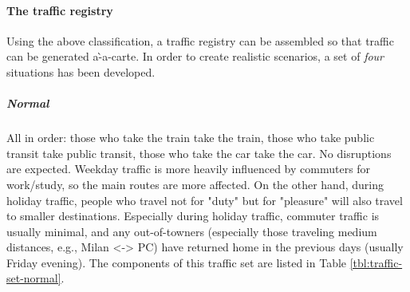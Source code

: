 \begin{table}[H]
  \label{tbl:traffic-types}
\end{table}

\paragraph{The traffic registry}

Using the above classification, a traffic registry can be assembled so that traffic can be generated a\`-a-carte.
In order to create realistic scenarios, a set of \textit{four} situations has been developed.

\subparagraph{Normal}

All in order: those who take the train take the train, those who take public transit take public transit, those who take the car take the car.
No disruptions are expected.
Weekday traffic is more heavily influenced by commuters for work/study, so the main routes are more affected.
On the other hand, during holiday traffic, people who travel not for "duty" but for "pleasure" will also travel to smaller destinations.
Especially during holiday traffic, commuter traffic is usually minimal, and any out-of-towners (especially those traveling medium distances, e.g., Milan <-> PC) have returned home in the previous days (usually Friday evening).
The components of this traffic set are listed in Table \ref{tbl:traffic-set-normal}.

